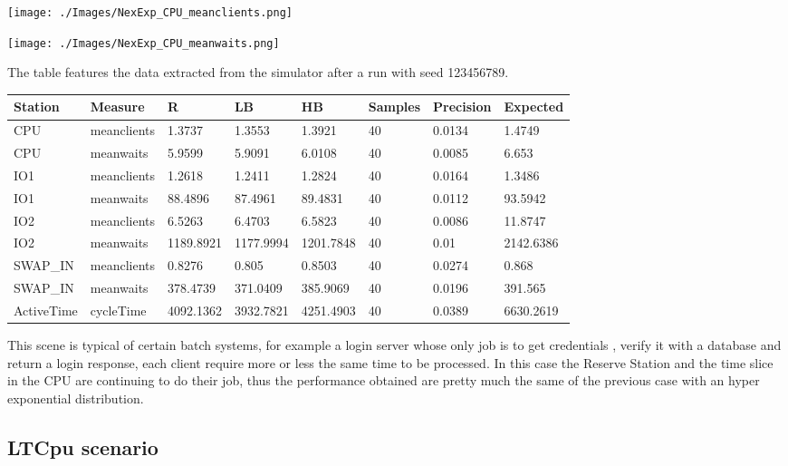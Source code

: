 \documentclass[12pt,a4paper]{article}
\begin{document}
\texttt{[image: ./Images/NexExp\_CPU\_meanclients.png]}

\texttt{[image: ./Images/NexExp\_CPU\_meanwaits.png]}

The table features the data extracted from the simulator after a run with seed 123456789.


\begin{table}[!ht]
    \centering
    \begin{tabular}{|l|l|l|l|l|l|l|l|}
    \hline
    Station & Measure & R & LB & HB & Samples & Precision & Expected \\ \hline
    CPU & meanclients & 1.3737 & 1.3553 & 1.3921 & 40 & 0.0134 & 1.4749 \\ \hline
    CPU & meanwaits & 5.9599 & 5.9091 & 6.0108 & 40 & 0.0085 & 6.653 \\ \hline
    IO1 & meanclients & 1.2618 & 1.2411 & 1.2824 & 40 & 0.0164 & 1.3486 \\ \hline
    IO1 & meanwaits & 88.4896 & 87.4961 & 89.4831 & 40 & 0.0112 & 93.5942 \\ \hline
    IO2 & meanclients & 6.5263 & 6.4703 & 6.5823 & 40 & 0.0086 & 11.8747 \\ \hline
    IO2 & meanwaits & 1189.8921 & 1177.9994 & 1201.7848 & 40 & 0.01 & 2142.6386 \\ \hline
    SWAP\_IN & meanclients & 0.8276 & 0.805 & 0.8503 & 40 & 0.0274 & 0.868 \\ \hline
    SWAP\_IN & meanwaits & 378.4739 & 371.0409 & 385.9069 & 40 & 0.0196 & 391.565 \\ \hline
    ActiveTime & cycleTime & 4092.1362 & 3932.7821 & 4251.4903 & 40 & 0.0389 & 6630.2619 \\ \hline
    \end{tabular}
\end{table}

This scene is typical of certain batch systems, for example a login server whose only job is to get credentials , verify it with a database and return a login response, each client require more or less the same time to be processed. In this case the Reserve Station and the time slice in the CPU are continuing to do their job, thus the performance obtained are pretty much the same of the previous case with an hyper exponential distribution.


\subsection{LTCpu scenario}
\end{document}
